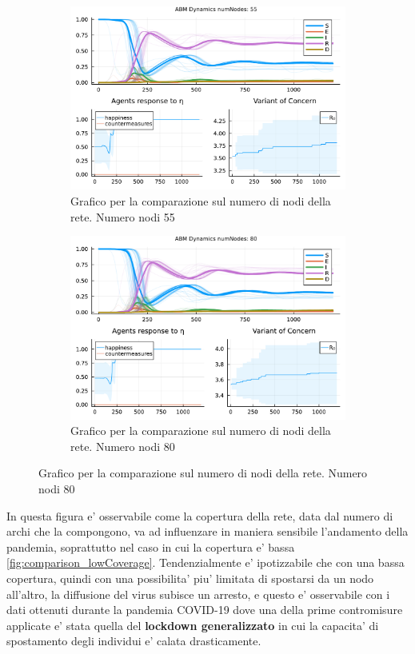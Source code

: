 \begin{figure}[!hb]
\begin{subfigure}[b]{0.45\textwidth}
		\includegraphics[width=\textwidth]{img/SocialNetworkABM_3_NN.pdf}
		\caption{Grafico per la comparazione sul numero di nodi della rete. Numero nodi 55}
		\label{fig:comparison_numberOfNodes_55}
	\end{subfigure}
	\hfill
	\begin{subfigure}[b]{0.45\textwidth}
		\centering
		\includegraphics[width=\textwidth]{img/SocialNetworkABM_4_NN.pdf}
		\caption{Grafico per la comparazione sul numero di nodi della rete. Numero nodi 80}
		\label{fig:comparison_numberOfNodes_80}
	\end{subfigure}
\end{figure}

\newpage

In questa figura e' osservabile come la copertura della rete, data dal numero di archi che la compongono,
va ad influenzare in maniera sensibile l'andamento della pandemia, soprattutto nel caso in cui la copertura e' 
bassa \ref{fig:comparison_lowCoverage}. Tendenzialmente e' ipotizzabile che con una bassa copertura, quindi 
con una possibilita' piu' limitata di spostarsi da un nodo all'altro, la diffusione del virus subisce un arresto, 
e questo e' osservabile con i dati ottenuti durante la pandemia COVID-19 dove una della prime contromisure applicate 
e' stata quella del \textbf{lockdown generalizzato} in cui la capacita' di spostamento degli individui 
e' calata drasticamente.

